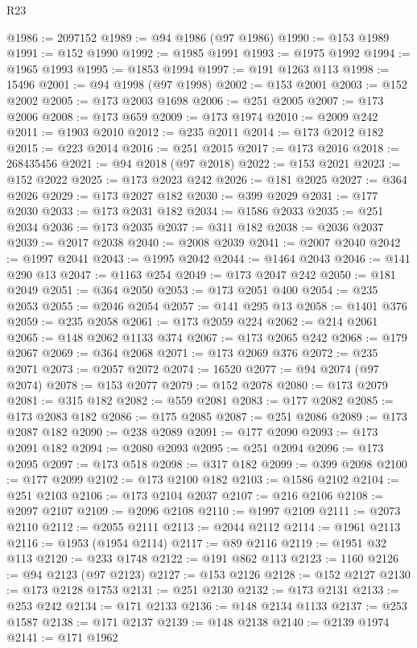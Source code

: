 \begin{lexlean}{R23}
\begin{coremodule}
@1986 := 2097152
@1989 := @94 @1986 (@97 @1986)
@1990 := @153 @1989
@1991 := @152 @1990
@1992 := @1985 @1991
@1993 := @1975 @1992
@1994 := @1965 @1993
@1995 := @1853 @1994
@1997 := @191 @1263 @113
@1998 := 15496
@2001 := @94 @1998 (@97 @1998)
@2002 := @153 @2001
@2003 := @152 @2002
@2005 := @173 @2003 @1698
@2006 := @251 @2005
@2007 := @173 @2006
@2008 := @173 @659
@2009 := @173 @1974
@2010 := @2009 @242
@2011 := @1903 @2010
@2012 := @235 @2011
@2014 := @173 @2012 @182
@2015 := @223 @2014
@2016 := @251 @2015
@2017 := @173 @2016
@2018 := 268435456
@2021 := @94 @2018 (@97 @2018)
@2022 := @153 @2021
@2023 := @152 @2022
@2025 := @173 @2023 @242
@2026 := @181 @2025
@2027 := @364 @2026
@2029 := @173 @2027 @182
@2030 := @399 @2029
@2031 := @177 @2030
@2033 := @173 @2031 @182
@2034 := @1586 @2033
@2035 := @251 @2034
@2036 := @173 @2035
@2037 := @311 @182
@2038 := @2036 @2037
@2039 := @2017 @2038
@2040 := @2008 @2039
@2041 := @2007 @2040
@2042 := @1997 @2041
@2043 := @1995 @2042
@2044 := @1464 @2043
@2046 := @141 @290 @13
@2047 := @1163 @254
@2049 := @173 @2047 @242
@2050 := @181 @2049
@2051 := @364 @2050
@2053 := @173 @2051 @400
@2054 := @235 @2053
@2055 := @2046 @2054
@2057 := @141 @295 @13
@2058 := @1401 @376
@2059 := @235 @2058
@2061 := @173 @2059 @224
@2062 := @214 @2061
@2065 := @148 @2062 @1133 @374
@2067 := @173 @2065 @242
@2068 := @179 @2067
@2069 := @364 @2068
@2071 := @173 @2069 @376
@2072 := @235 @2071
@2073 := @2057 @2072
@2074 := 16520
@2077 := @94 @2074 (@97 @2074)
@2078 := @153 @2077
@2079 := @152 @2078
@2080 := @173 @2079
@2081 := @315 @182
@2082 := @559 @2081
@2083 := @177 @2082
@2085 := @173 @2083 @182
@2086 := @175 @2085
@2087 := @251 @2086
@2089 := @173 @2087 @182
@2090 := @238 @2089
@2091 := @177 @2090
@2093 := @173 @2091 @182
@2094 := @2080 @2093
@2095 := @251 @2094
@2096 := @173 @2095
@2097 := @173 @518
@2098 := @317 @182
@2099 := @399 @2098
@2100 := @177 @2099
@2102 := @173 @2100 @182
@2103 := @1586 @2102
@2104 := @251 @2103
@2106 := @173 @2104 @2037
@2107 := @216 @2106
@2108 := @2097 @2107
@2109 := @2096 @2108
@2110 := @1997 @2109
@2111 := @2073 @2110
@2112 := @2055 @2111
@2113 := @2044 @2112
@2114 := @1961 @2113
@2116 := @1953 (@1954 @2114)
@2117 := @89 @2116
@2119 := @1951 @32 @113
@2120 := @233 @1748
@2122 := @191 @862 @113
@2123 := 1160
@2126 := @94 @2123 (@97 @2123)
@2127 := @153 @2126
@2128 := @152 @2127
@2130 := @173 @2128 @1753
@2131 := @251 @2130
@2132 := @173 @2131
@2133 := @253 @242
@2134 := @171 @2133
@2136 := @148 @2134 @1133
@2137 := @253 @1587
@2138 := @171 @2137
@2139 := @148 @2138
@2140 := @2139 @1974
@2141 := @171 @1962

\end{coremodule}
\end{lexlean}
